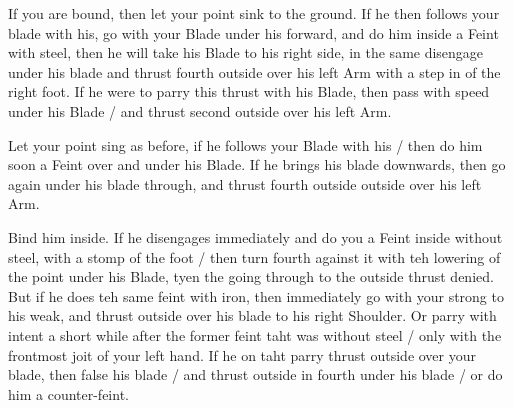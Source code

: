 \exercise{}

If you are bound, then let your point sink to the ground. If he then
follows your blade with his, go with your Blade under his forward, and
do him inside a Feint with steel, then he will take his Blade to his
right side, in the same disengage under his blade and thrust fourth
outside over his left Arm with a step in of the right foot. If he were
to parry this thrust with his Blade, then pass with speed under his
Blade / and thrust second outside over his left
Arm.

\exercise{}

Let your point sing as before, if he follows your Blade with his /
then do him soon a Feint over and under his Blade. If he brings his
blade downwards, then go again under his blade through, and thrust
fourth outside outside over his left Arm.



Bind him inside. If he disengages immediately and do you a Feint
inside without steel, with a stomp of the foot / then turn fourth
against it with teh lowering of the point under his Blade, tyen the
going through to the outside thrust denied. But if he does teh same
feint with iron, then immediately go with your strong to his weak, and
thrust outside over his blade to his right Shoulder. Or parry with
intent a short while after the former feint taht was without steel /
only with the frontmost joit of your left hand. If he on taht parry
thrust outside over your blade, then false his blade / and thrust
outside in fourth under his blade / or do him a counter-feint.
